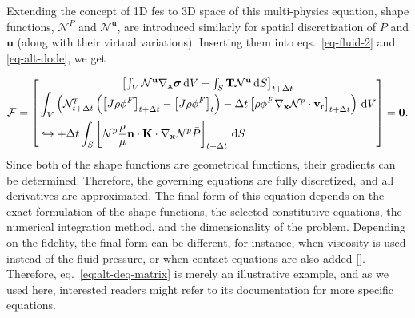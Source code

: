 \documentclass[12pt,a4paper]{report}
\begin{document}
Extending the concept of 1D \acp{fe} to 3D space of this multi-physics equation, shape functions, \( \mathcal{N}^P \) and \( \mathcal{N}^\mathbf{u} \), are introduced similarly for spatial discretization of \( P \) and \( \mathbf{u} \) (along with their virtual variations). Inserting them into eqs.~\ref{eq-fluid-2} and \ref{eq-alt-dode}, we get

%
\begin{equation}
    \mathcal{F} =
    \begin{bmatrix}
        \left[\int_V \mathcal{N}^\textbf{u} \nabla_\textbf{x} \boldsymbol{\sigma} \, {\mathrm d}V - \int_S \textbf{T} \mathcal{N}^\textbf{u} \, {\mathrm d}S\right]_{t+\Delta t} \\
        \begin{aligned}
            &\int_V \left ( \mathcal{N}^p_{t+\Delta t} \left( \left[ J \rho \phi^F \right]_{t+\Delta t} - \left[ J \rho \phi^F \right]_{t} \right) - \Delta t \left[ \rho \phi^F \nabla_{\mathbf{x}} \mathcal{N}^p \cdot \mathbf{v}_{\rm r} \right]_{t+\Delta t} \right) \, {\mathrm d}V \\
            &\hookrightarrow + \Delta t \int_S \left[ \mathcal{N}^p \frac{\rho}{\mu } \mathbf{n} \cdot \mathbf{K} \cdot \nabla_\mathbf{x} \mathcal{N}^p \bar{P} \right]_{t+\Delta t} \, {\mathrm d}S
        \end{aligned}
    \end{bmatrix}
    = \textbf{0}.
    \label{eq:alt-deq-matrix}
\end{equation}
%
Since both of the shape functions are geometrical functions, their gradients can be determined. Therefore, the governing equations are fully discretized, and all derivatives are approximated. The final form of this equation depends on the exact formulation of the shape functions, the selected constitutive equations, the numerical integration method, and the dimensionality of the problem. Depending on the fidelity, the final form can be different, for instance, when viscosity is used instead of the fluid pressure, or when contact equations are also added [\cite{pore2021,orava2022,orozco2022,oleg2023}]. Therefore, eq.~\ref{eq:alt-deq-matrix} is merely an illustrative example, and as we used \cite{abaqus} here, interested readers might refer to its documentation for more specific equations.
\end{document}
